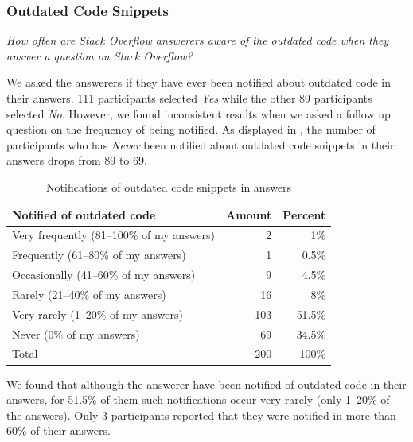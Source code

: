 \documentclass[10pt,journal,compsoc]{IEEEtran}
\begin{document}
\subsubsection{Outdated Code Snippets} 
\vspace{0.25cm}
\textit{How often are Stack Overflow
	answerers aware of the outdated code when
	they answer a question on Stack Overflow?} 
\vspace{0.25cm}

We asked the answerers if they have ever been notified about outdated code in
their answers. 111 participants selected \textit{Yes} while the other 89 participants
selected \textit{No}. However, we found inconsistent results when we asked a follow up
question on the frequency of being notified. As displayed in
, the number of participants who has
\textit{Never} been notified about outdated code snippets in their answers drops
from 89 to 69.

\begin{table}
	\centering
	\caption{Notifications of outdated code snippets in answers}
	\label{tab:survey_code_snippet_outdated}
	\begin{tabular}{lrr}
		\toprule
		Notified of outdated code & Amount & Percent \\
		\midrule
		Very frequently (81--100\% of my answers) & 2 & 1\% \\
		Frequently (61--80\% of my answers) & 1 & 0.5\% \\
		Occasionally (41--60\% of my answers) & 9 & 4.5\% \\
		Rarely (21--40\% of my answers) & 16 & 8\% \\
		Very rarely (1--20\% of my answers) & 103 & 51.5\% \\
		Never (0\% of my answers) & 69 & 34.5\% \\
		\midrule
		Total & 200 & 100\% \\
		\bottomrule
	\end{tabular}
\end{table}

We found that although the answerer have been notified of
outdated code in their answers, for 51.5\% of them such notifications occur very rarely (only 1--20\% of the answers). 
Only 3 participants reported that they were notified in more than 60\% of their answers.
\end{document}
